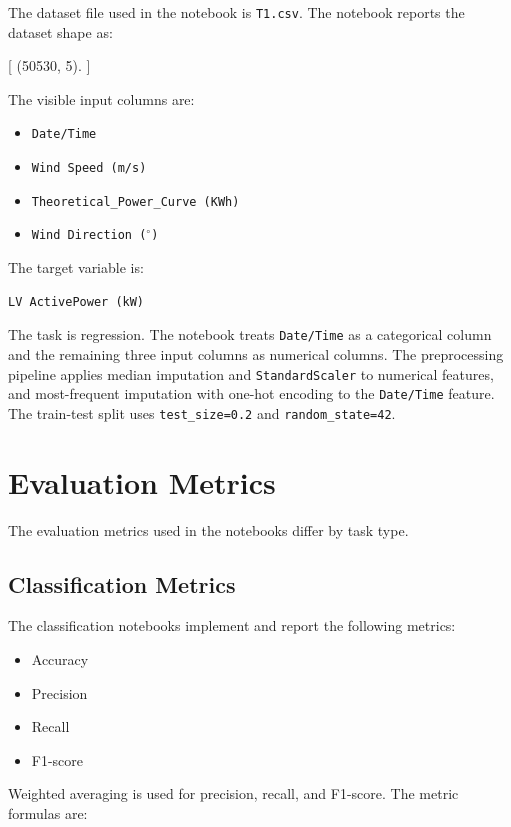 The dataset file used in the notebook is \texttt{T1.csv}. The notebook reports the dataset shape as:

[
    (50530, 5).
]

The visible input columns are:

\begin{itemize}
    \item \texttt{Date/Time}
    \item \texttt{Wind Speed (m/s)}
    \item \texttt{Theoretical\_Power\_Curve (KWh)}
    \item \texttt{Wind Direction ($^\circ$)}
\end{itemize}

The target variable is:

\begin{verbatim}
LV ActivePower (kW)
\end{verbatim}

The task is regression. The notebook treats \texttt{Date/Time} as a categorical column and the remaining three input columns as numerical columns. The preprocessing pipeline applies median imputation and \texttt{StandardScaler} to numerical features, and most-frequent imputation with one-hot encoding to the \texttt{Date/Time} feature. The train-test split uses \texttt{test\_size=0.2} and \texttt{random\_state=42}.

\section{Evaluation Metrics}
\label{sec:evaluation_metrics}

The evaluation metrics used in the notebooks differ by task type.

\subsection{Classification Metrics}

The classification notebooks implement and report the following metrics:

\begin{itemize}
    \item Accuracy
    \item Precision
    \item Recall
    \item F1-score
\end{itemize}

Weighted averaging is used for precision, recall, and F1-score. The metric formulas are:

